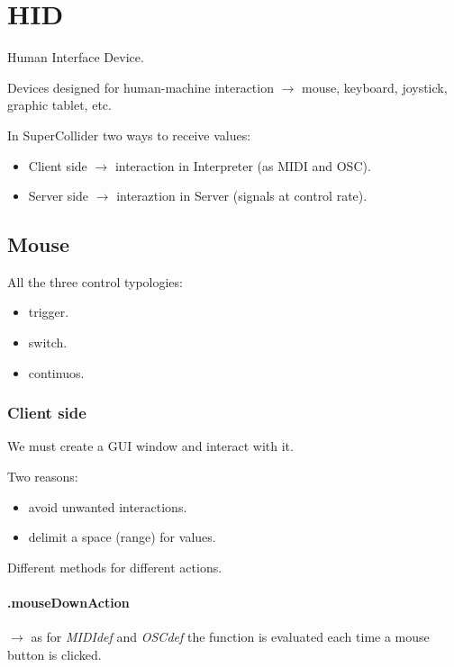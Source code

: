 \section{HID}\label{hid}

Human Interface Device.

Devices designed for human-machine interaction $\rightarrow$ mouse, keyboard, joystick, graphic tablet, etc.

In SuperCollider two ways to receive values:

\begin{itemize}
\tightlist
\item Client side \(\rightarrow\) interaction in Interpreter (as MIDI and OSC).
\item Server side \(\rightarrow\) interaztion in Server (signals at control rate).
\end{itemize}

\subsection{Mouse}\label{mouse}

All the three control typologies: 

\begin{itemize}
\tightlist
\item trigger.
\item switch.
\item continuos.
\end{itemize}

\subsubsection{Client side}\label{mouse-client-side}

We must create a GUI window and interact with it.

Two reasons:

\begin{itemize}
\tightlist
\item avoid unwanted interactions.
\item delimit a space (range) for values.
\end{itemize}

Different methods for different actions.

\paragraph{.mouseDownAction} \(\rightarrow\) as for \textit{MIDIdef} and \textit{OSCdef} the function is evaluated each time a mouse button is clicked.

